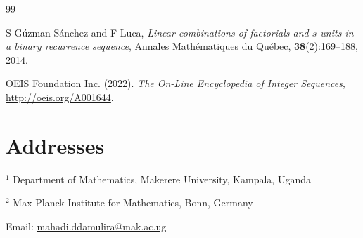 \documentclass[10pt,a4paper]{article}
\begin{document}
\begin{thebibliography}{99}

S G\'{u}zman S\'{a}nchez and F Luca,
\textit{Linear combinations of factorials and $s$-units in a binary recurrence sequence},
Annales Math\'{e}matiques du Qu\'{e}bec, {\bf 38}(2):169--188, 2014.





OEIS Foundation Inc. (2022). {\it The On-Line Encyclopedia of Integer Sequences}, \url{http://oeis.org/A001644}. 



\end{thebibliography}

\section*{Addresses}
\noindent
$ ^{1} $ Department of Mathematics, Makerere University, Kampala, Uganda

\noindent
$ ^{2} $ Max Planck Institute for Mathematics, Bonn, Germany

\noindent
Email: \url{mahadi.ddamulira@mak.ac.ug}
\end{document}
